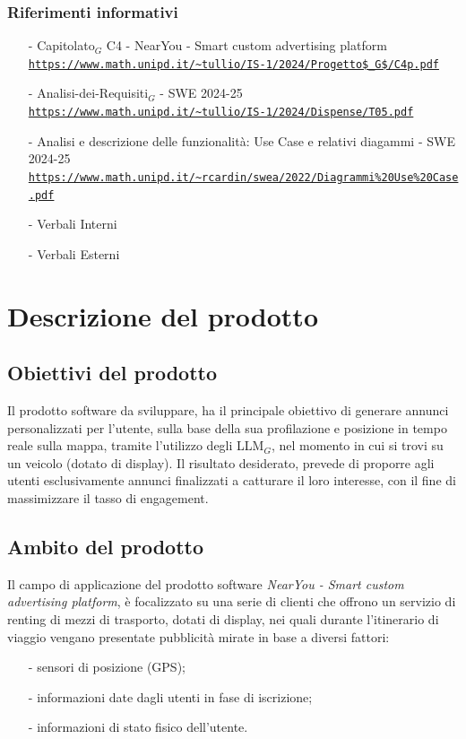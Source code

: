 \documentclass[11pt]{article}
\begin{document}
\begin{justify}
\begin{itemize}
\end{itemize}
\subsubsection{Riferimenti informativi}
\begin{itemize}
    \item[-] Capitolato$_G$ C4 - NearYou - Smart custom advertising platform\\
    \textcolor{blue}{\texttt{\url{https://www.math.unipd.it/~tullio/IS-1/2024/Progetto$_G$/C4p.pdf}}}
    \item[-] Analisi-dei-Requisiti$_G$ - SWE 2024-25\\
    \textcolor{blue}{\texttt{\url{https://www.math.unipd.it/~tullio/IS-1/2024/Dispense/T05.pdf}}}
    \item[-] Analisi e descrizione delle funzionalità: Use Case e relativi diagammi - SWE 2024-25\\    
    \textcolor{blue}{\texttt{\url{https://www.math.unipd.it/~rcardin/swea/2022/Diagrammi\%20Use\%20Case.pdf}}}
    \item[-] Verbali Interni
    \item[-] Verbali Esterni
    
\end{itemize}

\newpage
\section{Descrizione del prodotto}
\label{sec:descrizione}
\subsection{Obiettivi del prodotto}
Il prodotto software da sviluppare, ha il principale obiettivo di generare annunci personalizzati per l'utente, sulla base della sua profilazione e posizione in tempo reale sulla mappa, tramite l'utilizzo degli LLM$_G$, nel momento in cui si trovi su un veicolo (dotato di display). Il risultato desiderato, prevede di proporre agli utenti esclusivamente annunci finalizzati a catturare il loro interesse, con il fine di massimizzare il tasso di engagement.

\subsection{Ambito del prodotto}
Il campo di applicazione del prodotto software \textit{NearYou - 
Smart custom advertising platform}, è focalizzato su una serie di clienti che offrono un servizio di renting di mezzi di trasporto, dotati di display, nei quali durante l'itinerario di viaggio vengano presentate pubblicità mirate in base a diversi fattori:
\begin{itemize}
    \item [-] sensori di posizione (GPS);
    \item [-] informazioni date dagli utenti in fase di iscrizione;
    \item [-] informazioni di stato fisico dell’utente.
\end{itemize}


\end{justify}
\end{document}
